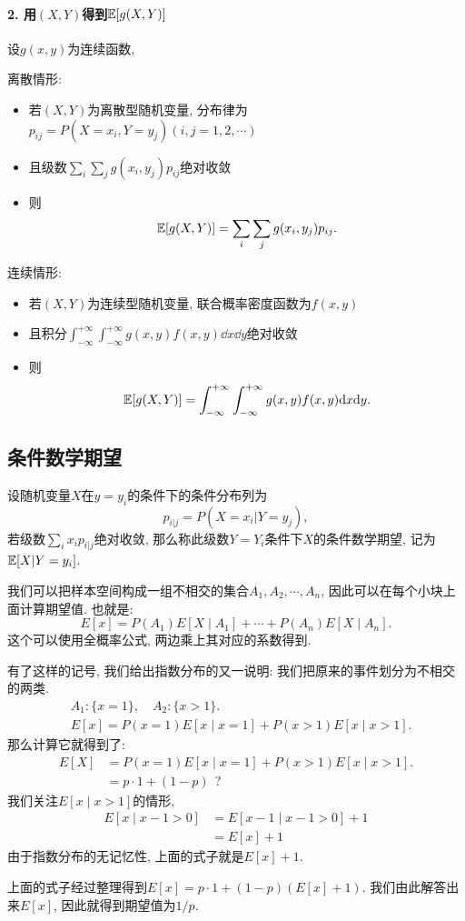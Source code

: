     \paragraph{2. 用$(X,Y)$得到$\mathbb E[g(X,Y)]$}设$g(x,y)$为连续函数, 

    离散情形: 
    \begin{itemize}
        \item 若$(X,Y)$为离散型随机变量, 分布律为$p_{ij} = P(X=x_i,Y=y_j)(i,j=1,2,\cdots)$
        \item 且级数$\sum_i \sum_j g(x_i,y_j)p_{ij}$绝对收敛
        \item 则$$\mathbb E[g(X,Y)]=\sum_i \sum_j g(x_i,y_j)p_{ij}.$$
    \end{itemize}    

    连续情形:\begin{itemize}
        \item 若$(X,Y)$为连续型随机变量, 联合概率密度函数为$f(x,y)$
        \item 且积分$\int_{-\infty}^{+\infty}\int_{-\infty}^{+\infty}g(x,y)f(x,y)\dd x\dd y$绝对收敛
        \item 则$$\mathbb E[g(X,Y)]=\int_{-\infty}^{+\infty}\int_{-\infty}^{+\infty}g(x,y)f(x,y)\mathrm{d} x\mathrm{d} y.$$
    \end{itemize}  

    \subsection{条件数学期望}

    \begin{definition}
        设随机变量$X$在$y=y_i$的条件下的条件分布列为
        $$
        p_{i|j}=P(X=x_i | Y=y_j),
        $$
        若级数$\sum_i x_i p_{i|j}$绝对收敛, 那么称此级数$Y=Y_i$条件下$X$的条件数学期望, 记为$\mathbb E[X|Y=y_i]$.
    \end{definition}

    我们可以把样本空间构成一组不相交的集合$A_1, A_2, \cdots, A_n$, 因此可以在每个小块上面计算期望值. 也就是: $$
    E[x]=P\left(A_1\right) E\left[X \mid A_1\right]+\cdots+P\left(A_n\right) E\left[X \mid A_n\right] .
    $$
    这个可以使用全概率公式, 两边乘上其对应的系数得到. 


    有了这样的记号, 我们给出指数分布的又一说明: 
    我们把原来的事件划分为不相交的两类. 
    $$
    \begin{aligned}
    & A_1:\{x=1\}, \quad A_2:\{x>1\} . \\
    & E[x]=P(x=1) E[x \mid x=1]+P(x>1) E[x \mid x>1] .
    \end{aligned}
    $$
    那么计算它就得到了: 
    $$
\begin{aligned}
E[X] & =P(x=1) E[x \mid x=1]+P(x>1) E[x \mid x>1] . \\
& =p \cdot 1+(1-p)\boxed{~~?~~}
\end{aligned}
$$
我们关注$E[x \mid x>1]$的情形, $$
\begin{aligned}
E[x \mid x-1>0] & =E[x-1 \mid x-1>0]+1 \\
& =E[x]+1
\end{aligned}
$$
由于指数分布的无记忆性, 上面的式子就是$E[x]+1$. 

上面的式子经过整理得到$E[x]=p \cdot 1+(1-p)(E[x]+1)$. 我们由此解答出来$E[x]$, 因此就得到期望值为$1/p$. 